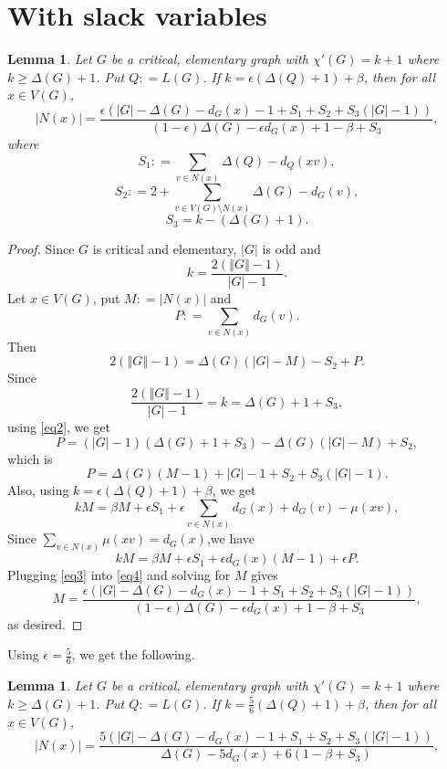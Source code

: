 \documentclass[12pt]{amsart}
\theoremstyle{plain}
\newtheorem{lem}[thm]{Lemma}
\theoremstyle{definition}
\theoremstyle{remark}
\newcommand{\card}[1]{\left|#1\right|}
\newcommand{\size}[1]{\left\Vert#1\right\Vert}
\newcommand{\parens}[1]{\left( #1 \right)}
\newcommand{\DefinedAs}{\mathrel{\mathop:}=}
\begin{document}
\section{With slack variables}
\begin{lem}
Let $G$ be a critical, elementary graph with $\chi'(G) = k + 1$ where $k \ge \Delta(G) + 1$.  Put $Q \DefinedAs L(G)$.  
If $k = \epsilon\parens{\Delta(Q) + 1} + \beta$, then for all $x \in V(G)$,
\[\card{N(x)} = \frac{\epsilon\parens{|G| - \Delta(G) - d_G(x) - 1 + S_1 + S_2 + S_3\parens{\card{G} - 1}}}{(1-\epsilon)\Delta(G) - \epsilon d_G(x) + 1 - \beta + S_3},\]
where 
\[S_1 \DefinedAs \sum_{v \in N(x)} \Delta(Q) - d_Q(xv),\]
\[S_2 \DefinedAs 2 + \sum_{v \in V(G) \setminus N(x)} \Delta(G) - d_G(v),\]
\[S_3 = k - (\Delta(G) + 1).\]
\end{lem}
\begin{proof}
Since $G$ is critical and elementary, $\card{G}$ is odd and
\begin{equation}\label{eq1}
k = \frac{2(\size{G} - 1)}{\card{G} - 1}.
\end{equation}
Let $x \in V(G)$, put $M \DefinedAs \card{N(x)}$ and 
\[P \DefinedAs \sum_{v \in N(x)} d_G(v).\] 
Then
\begin{equation}\label{eq2}
2(\size{G} - 1) = \Delta(G)(|G| - M) - S_2 + P.
\end{equation}
Since 
\[\frac{2(\size{G} - 1)}{\card{G} - 1} = k = \Delta(G) + 1 + S_3,\]
using \eqref{eq2}, we get
\[P = (|G| - 1)(\Delta(G) + 1 + S_3) - \Delta(G)(|G| - M) + S_2,\]
which is
\begin{equation}\label{eq3}
P = \Delta(G)(M-1) + |G| - 1 + S_2 + S_3(|G| - 1).
\end{equation}
Also, using $k = \epsilon\parens{\Delta(Q) + 1} + \beta$, we get
\[kM = \beta M + \epsilon S_1 + \epsilon\sum_{v \in N(x)} d_G(x) + d_G(v) - \mu(xv),\]
Since $\sum_{v \in N(x)} \mu(xv) = d_G(x)$,we have
\begin{equation}\label{eq4}
kM = \beta M + \epsilon S_1 + \epsilon d_G(x)(M - 1) + \epsilon P.
\end{equation}
Plugging \eqref{eq3} into \eqref{eq4} and solving for $M$ gives
\[M= \frac{\epsilon\parens{|G| - \Delta(G) - d_G(x) - 1 + S_1 + S_2 + S_3\parens{\card{G} - 1}}}{(1-\epsilon)\Delta(G) - \epsilon d_G(x) + 1 - \beta + S_3},\]
as desired.
\end{proof}

Using $\epsilon = \frac56$, we get the following.

\begin{lem}
Let $G$ be a critical, elementary graph with $\chi'(G) = k + 1$ where $k \ge \Delta(G) + 1$.  Put $Q \DefinedAs L(G)$. 
If $k = \frac56\parens{\Delta(Q) + 1} + \beta$, then for all $x \in V(G)$,
\[\card{N(x)} = \frac{5\parens{|G| - \Delta(G) - d_G(x) - 1 + S_1 + S_2 + S_3\parens{\card{G} - 1}}}{\Delta(G) - 5 d_G(x) + 6(1 - \beta + S_3)},\]
\end{lem}
\end{document}
